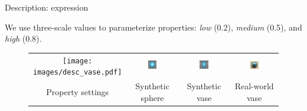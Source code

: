 \documentclass[10pt]{beamer}
\begin{document}
\begin{frame}{Description: expression}

We use three-scale values to parameterize properties: \textit{low} (0.2), \textit{medium} (0.5), and \textit{high} (0.8).

\begin{figure}[!htbp]
\centering
\begin{tabular}{cccc}
  \texttt{[image: images/desc\_vase.pdf]}&
  \includegraphics[width=0.2\textwidth]{interp/ui/ui_sphere.png}&
  \includegraphics[width=0.2\textwidth]{interp/ui/ui_vase.png}&
  \includegraphics[width=0.2\textwidth]{interp/real_world_img/vase/vase.jpg}\\
  Property settings & Synthetic sphere & Synthetic vase & Real-world vase\\
\end{tabular}
\end{figure}

\end{frame}

\end{document}
